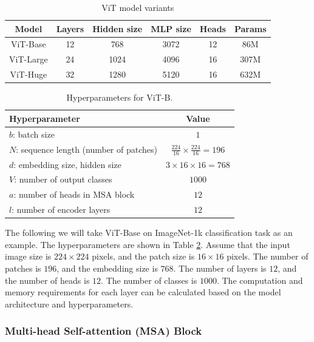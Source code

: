 \documentclass[12pt]{article}
\begin{document}
\begin{table}[h]
    \centering
    \begin{tabular}{cccccc}
    \hline
    \textbf{Model} & \textbf{Layers} & \textbf{Hidden size} & \textbf{MLP size} & \textbf{Heads} & \textbf{Params} \\
    \hline
    ViT-Base  & 12 & 768  & 3072 & 12 & 86M  \\
    ViT-Large & 24 & 1024 & 4096 & 16 & 307M \\
    ViT-Huge  & 32 & 1280 & 5120 & 16 & 632M \\
    \hline
    \end{tabular}
    \caption{ViT model variants \cite{dosovitskiy_image_2021}}
    \label{tab:vit-variants}
\end{table}

\begin{table}[h]
    \centering
    \renewcommand{\arraystretch}{1.4} %
    \begin{tabular}{lc}
    \hline
    \textbf{Hyperparameter} & \textbf{Value} \\
    \hline
    $b$: batch size & $1$ \\
    $N$: sequence length (number of patches) & $\frac{224}{16} \times \frac{224}{16} = 196$ \\
    $d$: embedding size, hidden size & $3 \times 16 \times 16 = 768$ \\
    $V$: number of output classes & $1000$ \\
    $a$: number of heads in MSA block & $12$ \\
    $l$: number of encoder layers & $12$ \\
    \hline
    \end{tabular}
    \caption{Hyperparameters for ViT-B.}
    \label{tab:hyperparameters}
\end{table}

The following we will take ViT-Base on ImageNet-1k classification task as an example. The hyperparameters are shown in Table \ref{tab:hyperparameters}. Assume that the input image size is $224 \times 224$ pixels, and the patch size is $16 \times 16$ pixels. The number of patches is $196$, and the embedding size is $768$. The number of layers is $12$, and the number of heads is $12$. The number of classes is $1000$. The computation and memory requirements for each layer can be calculated based on the model architecture and hyperparameters.

\subsubsection{Multi-head Self-attention (MSA) Block}
\end{document}
